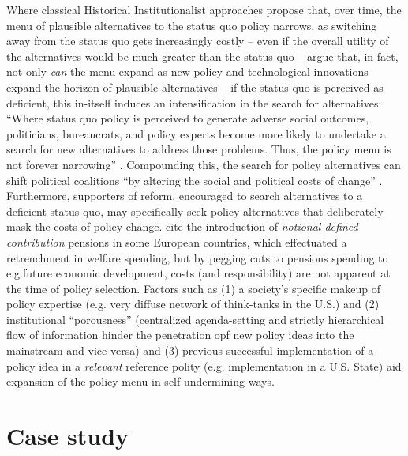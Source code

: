\documentclass[11pt]{article}
\begin{document}
Where classical Historical Institutionalist approaches propose that, over time, the menu of plausible alternatives to the status quo policy narrows, as switching away from the status quo gets increasingly costly -- even if the overall utility of the alternatives would be much greater than the status quo --\textcite[][]{Jacobs2014} argue that, in fact, not only \textit{can} the menu expand as new policy and technological innovations expand the horizon of plausible alternatives -- if the status quo is perceived as deficient, this in-itself induces an intensification in the search for alternatives: \enquote{Where status quo policy is perceived to generate adverse social outcomes, politicians, bureaucrats, and policy experts become more likely to undertake a search for new alternatives to address those problems. Thus, the policy menu is not forever narrowing} . Compounding this, the search for policy alternatives can shift political coalitions \enquote{by altering the social and political costs of change} \parencite[][p. 449]{Jacobs2014}. Furthermore, supporters of reform, encouraged to search alternatives to a deficient status quo, may specifically seek policy alternatives that deliberately mask the costs of policy change. \textcite[][]{Jacobs2014} cite the introduction of \textit{notional-defined contribution} pensions in some European countries, which effectuated a retrenchment in welfare spending, but by pegging cuts to pensions spending to e.g.future economic development, costs (and responsibility) are not apparent at the time of policy selection. Factors such as (1) a society's specific makeup of policy expertise (e.g. very diffuse network of think-tanks in the U.S.) and (2) institutional \enquote{porousness} \parencite[][p. 449]{Jacobs2014} (centralized agenda-setting and strictly hierarchical flow of information hinder the penetration opf new policy ideas into the mainstream and vice versa) and (3) previous successful implementation of a policy idea in a \textit{relevant} reference polity (e.g. implementation in a U.S. State) aid expansion of the policy menu in self-undermining ways.


\section*{Case study}
\end{document}
